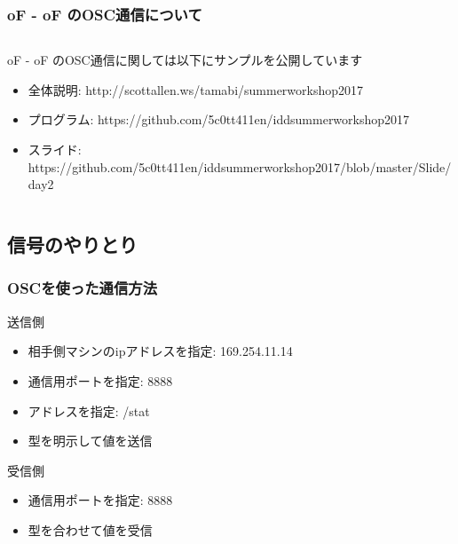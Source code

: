 \documentclass[10pt, dvipdfmx]{beamer}
\begin{document}
        \begin{frame}
            \frametitle{oF - oF のOSC通信について}
            \begin{columns}[c]
                \begin{column}{0.80\textwidth}
                    \begin{block}{oF - oF のOSC通信に関しては以下にサンプルを公開しています}
                        \begin{itemize}
                            \scriptsize
                            \item 全体説明: http://scottallen.ws/tamabi/summerworkshop2017
                            \item プログラム: https://github.com/5c0tt411en/iddsummerworkshop2017
                            \item スライド: https://github.com/5c0tt411en/iddsummerworkshop2017/blob/master/Slide/day2
                        \end{itemize}
                    \end{block}
                \end{column}
            \end{columns}
        \end{frame}

    \subsection{信号のやりとり}
        \begin{frame}
            \frametitle{OSCを使った通信方法}
            \begin{block}{送信側}
                \begin{itemize}
                    \item 相手側マシンのipアドレスを指定: 169.254.11.14
                    \item 通信用ポートを指定: 8888
                    \item アドレスを指定: /stat
                    \item 型を明示して値を送信
                \end{itemize}
            \end{block}
            \begin{block}{受信側}
                \begin{itemize}
                    \item 通信用ポートを指定: 8888
                    \item 型を合わせて値を受信
                \end{itemize}
            \end{block}
        \end{frame}
\end{document}
